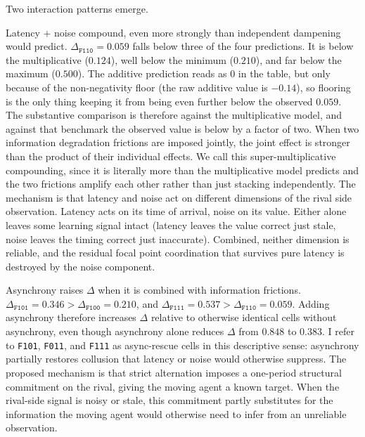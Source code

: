 \noindent Two interaction patterns emerge.

Latency $+$ noise compound, even more strongly than independent dampening would predict. $\Delta_{\texttt{F110}} = 0.059$ falls below three of the four predictions. It is below the multiplicative ($0.124$), well below the minimum ($0.210$), and far below the maximum ($0.500$). The additive prediction reads as $0$ in the table, but only because of the non-negativity floor (the raw additive value is $-0.14$), so flooring is the only thing keeping it from being even further below the observed $0.059$. The substantive comparison is therefore against the multiplicative model, and against that benchmark the observed value is below by a factor of two. When two information degradation frictions are imposed jointly, the joint effect is stronger than the product of their individual effects. We call this super-multiplicative compounding, since it is literally more than the multiplicative model predicts and the two frictions amplify each other rather than just stacking independently. The mechanism is that latency and noise act on different dimensions of the rival side observation. Latency acts on its time of arrival, noise on its value. Either alone leaves some learning signal intact (latency leaves the value correct just stale, noise leaves the timing correct just inaccurate). Combined, neither dimension is reliable, and the residual focal point coordination that survives pure latency is destroyed by the noise component.

\medskip

Asynchrony raises $\Delta$ when it is combined with information frictions. $\Delta_{\texttt{F101}} = 0.346 > \Delta_{\texttt{F100}} = 0.210$, and $\Delta_{\texttt{F111}} = 0.537 > \Delta_{\texttt{F110}} = 0.059$. Adding asynchrony therefore increases $\Delta$ relative to otherwise identical cells without asynchrony, even though asynchrony alone reduces $\Delta$ from $0.848$ to $0.383$. I refer to \texttt{F101}, \texttt{F011}, and \texttt{F111} as async-rescue cells in this descriptive sense: asynchrony partially restores collusion that latency or noise would otherwise suppress. The proposed mechanism is that strict alternation imposes a one-period structural commitment on the rival, giving the moving agent a known target. When the rival-side signal is noisy or stale, this commitment partly substitutes for the information the moving agent would otherwise need to infer from an unreliable observation.

\medskip

